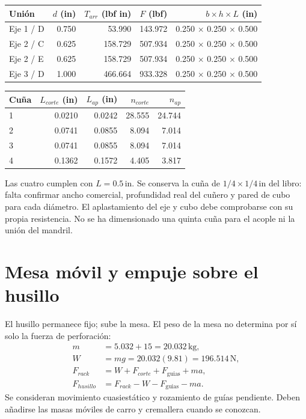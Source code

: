 \documentclass[11pt,a4paper]{article}
\newcommand{\inch}{\,\mathrm{in}}
\begin{document}
\begin{center}\small\begin{tabular}{lrrrr}\toprule

Unión & $d$ (in) & $T_{arr}$ (lbf in) & $F$ (lbf) & $b\times h\times L$ (in) \\ \midrule

Eje 1 / D & 0.750 & 53.990 & 143.972 & 0.250 $\times$ 0.250 $\times$ 0.500 \\

Eje 2 / C & 0.625 & 158.729 & 507.934 & 0.250 $\times$ 0.250 $\times$ 0.500 \\

Eje 2 / E & 0.625 & 158.729 & 507.934 & 0.250 $\times$ 0.250 $\times$ 0.500 \\

Eje 3 / D & 1.000 & 466.664 & 933.328 & 0.250 $\times$ 0.250 $\times$ 0.500 \\

\bottomrule\end{tabular}\end{center}

\begin{center}\small\begin{tabular}{lrrrr}\toprule

Cuña & $L_{corte}$ (in) & $L_{ap}$ (in) & $n_{corte}$ & $n_{ap}$ \\ \midrule

1 & 0.0210 & 0.0242 & 28.555 & 24.744 \\

2 & 0.0741 & 0.0855 & 8.094 & 7.014 \\

3 & 0.0741 & 0.0855 & 8.094 & 7.014 \\

4 & 0.1362 & 0.1572 & 4.405 & 3.817 \\

\bottomrule\end{tabular}\end{center}

Las cuatro cumplen con $L=0.5\inch$. Se conserva la cuña de $1/4\times1/4\inch$ del libro: falta confirmar ancho comercial, profundidad real del cuñero y pared de cubo para cada diámetro. El aplastamiento del eje y cubo debe comprobarse con su propia resistencia. No se ha dimensionado una quinta cuña para el acople ni la unión del mandril.
\clearpage
\section{Mesa móvil y empuje sobre el husillo}
El husillo permanece fijo; sube la mesa. El peso de la mesa no determina por sí solo la fuerza de perforación:
\begin{align*}
m&=5.032+15=20.032\,\mathrm{kg},\\
W&=mg=20.032(9.81)=196.514\,\mathrm N,\\
F_{rack}&=W+F_{corte}+F_{\mathrm{guias}}+ma,\\
F_{husillo}&=F_{rack}-W-F_{\mathrm{guias}}-ma.
\end{align*}
Se consideran movimiento cuasiestático y rozamiento de guías pendiente. Deben añadirse las masas móviles de carro y cremallera cuando se conozcan.
\end{document}
